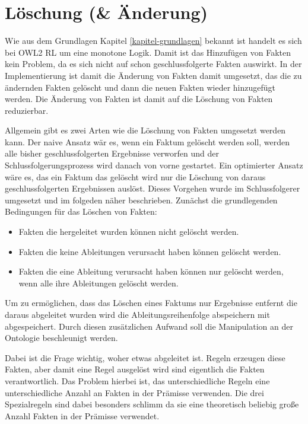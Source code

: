 \section{Löschung (\& Änderung)}

Wie aus dem Grundlagen Kapitel \ref{kapitel-grundlagen} bekannt ist handelt es sich bei OWL2 RL um eine monotone Logik. Damit ist das Hinzufügen von Fakten kein Problem, da es sich nicht auf schon geschlussfolgerte Fakten auswirkt. In der Implementierung ist damit die Änderung von Fakten damit umgesetzt, das die zu ändernden Fakten gelöscht und dann die neuen Fakten wieder hinzugefügt werden. Die Änderung von Fakten ist damit auf die Löschung von Fakten reduzierbar.

Allgemein gibt es zwei Arten wie die Löschung von Fakten umgesetzt werden kann. Der naive Ansatz wär es, wenn ein Faktum gelöscht werden soll, werden alle bisher geschlussfolgerten Ergebnisse verworfen und der Schlussfolgerungsprozess wird danach von vorne gestartet. Ein optimierter Ansatz wäre es, das ein Faktum das gelöscht wird nur die Löschung von daraus geschlussfolgerten Ergebnissen auslöst. Dieses Vorgehen wurde im Schlussfolgerer umgesetzt und im folgeden näher beschrieben. Zunächst die grundlegenden Bedingungen für das Löschen von Fakten:

\begin{itemize}
  \item Fakten die hergeleitet wurden können nicht gelöscht werden.
  \item Fakten die keine Ableitungen verursacht haben können gelöscht werden.
  \item Fakten die eine Ableitung verursacht haben können nur gelöscht werden, wenn alle ihre Ableitungen gelöscht werden.
\end{itemize}

Um zu ermöglichen, dass das Löschen eines Faktums nur Ergebnisse entfernt die daraus abgeleitet wurden wird die Ableitungsreihenfolge abspeichern mit abgespeichert. Durch diesen zusätzlichen Aufwand soll die Manipulation an der Ontologie beschleunigt werden.

Dabei ist die Frage wichtig, woher etwas abgeleitet ist. Regeln erzeugen diese Fakten, aber damit eine Regel ausgelöst wird sind eigentlich die Fakten verantwortlich. Das Problem hierbei ist, das unterschiedliche Regeln eine unterschiedliche Anzahl an Fakten in der Prämisse verwenden. Die drei Spezialregeln sind dabei besonders schlimm da sie eine theoretisch beliebig große Anzahl Fakten in der Prämisse verwendet.

